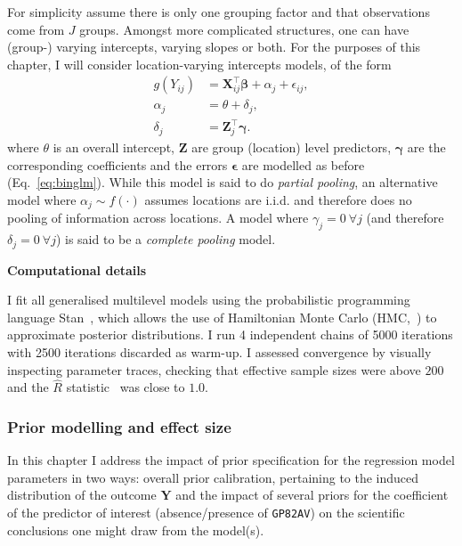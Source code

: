 For simplicity assume there is only one grouping factor and that observations come from $J$ groups.
Amongst more complicated structures, one can have (group-) varying intercepts, varying slopes or both.
For the purposes of this chapter, I will consider location-varying intercepts models, of the form
\begin{align}
 \label{eq:varyingintA}
  g(Y_{ij}) &= \boldsymbol X_{ij}^\intercal \boldsymbol\beta + \alpha_j  + \epsilon_{ij},\\
  \alpha_j &= \theta + \delta_j, \\
   \label{eq:varyingintB}
  \delta_j &= \boldsymbol Z_j^\intercal \boldsymbol\gamma.
\end{align}
where $\theta$ is an overall intercept, $\boldsymbol Z$ are group (location) level predictors, $\boldsymbol\gamma$ are the corresponding coefficients and the errors $\boldsymbol\epsilon$ are modelled as before (Eq.~\ref{eq:binglm}).
While this model is said to do \textit{partial pooling}, an alternative model where $\alpha_j\sim f(\cdot)$ assumes locations are i.i.d. and therefore does no pooling of information across locations.
A model where $\gamma_j = 0 \: \forall j$ (and therefore $\delta_j = 0 \: \forall j$) is said to be a \textit{complete pooling} model.

\textbf{Computational details}

I fit all generalised multilevel models using the probabilistic programming language Stan~\citep{Carpenter2017}, which allows the use  of Hamiltonian Monte Carlo (HMC,~\cite{Neal2011}) to approximate posterior distributions.
I run 4 independent chains of 5000 iterations with 2500 iterations discarded as warm-up.
I assessed convergence by visually inspecting parameter traces, checking that effective sample sizes were above $200$ and the $\hat{R}$ statistic~\citep{Brooks1998} was close to $1.0$.

\subsubsection{Prior modelling and effect size}
\label{sec:priors}

In this chapter I address the impact of prior specification for the regression model parameters in two ways: overall prior calibration, pertaining to the induced distribution of the outcome $\boldsymbol Y$ and the impact of several priors for the coefficient of the predictor of interest (absence/presence of \verb|GP82AV|) on the scientific conclusions one might draw from the model(s).


